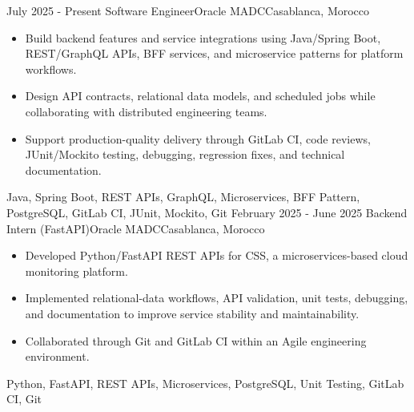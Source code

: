 
\begin{experiences}
  \experience
    {July 2025 - Present}
    {Software Engineer}{Oracle MADC}{Casablanca, Morocco}
    {} {
      \begin{itemize}
        \item Build backend features and service integrations using Java/Spring Boot, REST/GraphQL APIs, BFF services, and microservice patterns for platform workflows.
        \item Design API contracts, relational data models, and scheduled jobs while collaborating with distributed engineering teams.
        \item Support production-quality delivery through GitLab CI, code reviews, JUnit/Mockito testing, debugging, regression fixes, and technical documentation.
      \end{itemize}
    }
    {Java, Spring Boot, REST APIs, GraphQL, Microservices, BFF Pattern, PostgreSQL, GitLab CI, JUnit, Mockito, Git}
  \experience
    {February 2025 - June 2025}
    {Backend Intern (FastAPI)}{Oracle MADC}{Casablanca, Morocco}
    {} {
      \begin{itemize}
        \item Developed Python/FastAPI REST APIs for CSS, a microservices-based cloud monitoring platform.
        \item Implemented relational-data workflows, API validation, unit tests, debugging, and documentation to improve service stability and maintainability.
        \item Collaborated through Git and GitLab CI within an Agile engineering environment.
      \end{itemize}
    }
    {Python, FastAPI, REST APIs, Microservices, PostgreSQL, Unit Testing, GitLab CI, Git}
  \emptySeparator
\end{experiences}
